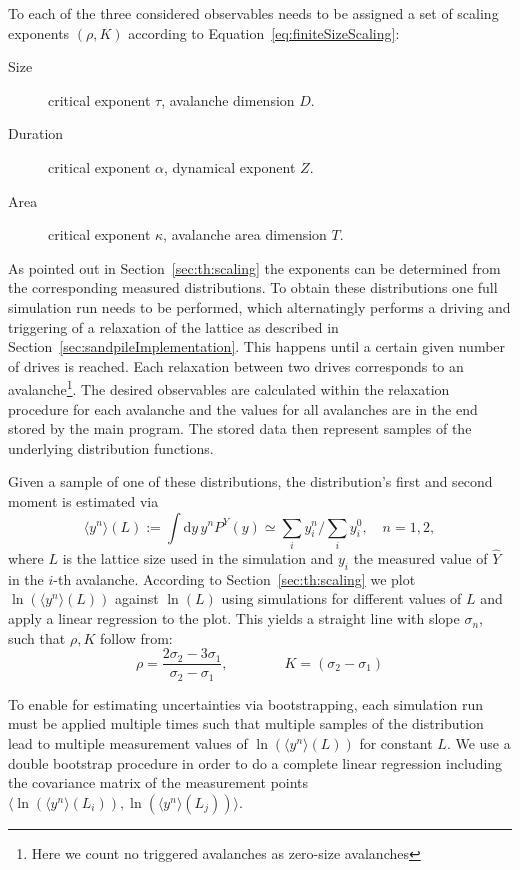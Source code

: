 To each of the three considered observables needs to be assigned a set of scaling exponents $(\rho,K)$
according to Equation~\eqref{eq:finiteSizeScaling}:
\begin{description}
\item[Size] critical exponent $\tau$, avalanche dimension $D$.
\item[Duration] critical exponent $\alpha$, dynamical exponent $Z$.
\item[Area] critical exponent $\kappa$, avalanche area dimension $T$.
\end{description}

As pointed out in Section~\ref{sec:th:scaling} the exponents can be determined from the corresponding measured
distributions. To obtain these distributions one full simulation run needs to be performed, which alternatingly performs
a driving and triggering of a relaxation of the lattice as described in Section~\ref{sec:sandpileImplementation}.
This happens until a certain given number of drives is reached. Each relaxation between two drives corresponds to an
avalanche\footnote{Here we count no triggered avalanches as zero-size avalanches}. The desired observables are
calculated within the relaxation procedure for each avalanche and the values for all avalanches are in the end stored
by the main program. The stored data then represent samples of the underlying distribution functions.

Given a sample of one of these distributions, the distribution's first and second moment is estimated via
\begin{equation}
\langle y^n\rangle(L) := \int\!\mathrm{d}y\, y^n P^{Y}(y) \simeq \sum_i y_i^n \Big/ \sum_i y_i^0,\quad n=1,2,
\end{equation}
where $L$ is the lattice size used in the simulation and $y_i$ the measured value of $\hat{Y}$ in the $i$-th avalanche.
According to Section~\ref{sec:th:scaling} we plot $\ln\left(\langle y^n\rangle(L)\right)$ against $\ln\left(L\right)$
using simulations for different values of $L$ and apply a linear regression to the plot. This yields a straight line
with slope $\sigma_n$, such that $\rho, K$ follow from:
\begin{equation}
\rho = \frac{2\sigma_2 - 3\sigma_1}{\sigma_2 - \sigma_1}, \qquad\qquad K = (\sigma_2-\sigma_1)
\end{equation}

To enable for estimating uncertainties via bootstrapping, each simulation run must be applied multiple times such that
multiple samples of the distribution lead to multiple measurement values of $\ln\left(\langle y^n\rangle(L)\right)$
for constant $L$. We use a double bootstrap procedure in order to do a complete linear regression
including the covariance matrix of the measurement points
$\langle\ln\left(\langle y^n\rangle(L_i)\right), \ln\left(\langle y^n\rangle(L_j)\right)\rangle$.


